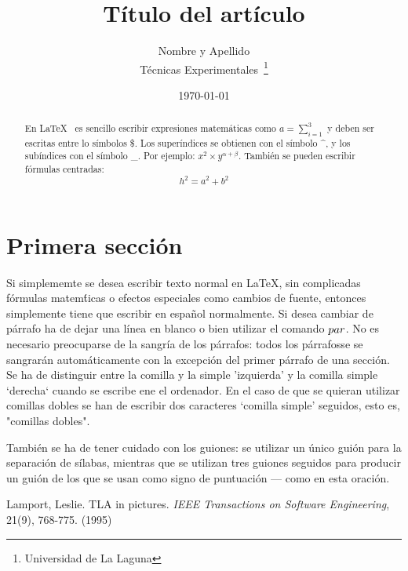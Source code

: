 \documentclass[a4paper,12pt]{article}
\begin{document}
\title{Título del artículo}
\author{Nombre y Apellido \\
Técnicas Experimentales~\footnote{Universidad de La Laguna}
}
\date{\today}
\maketitle

\begin{abstract}
En \LaTeX{}~\cite{Lam:86} es sencillo escribir expresiones
matemáticas como $a=\sum_{i=1}^{3}$
y deben ser escritas entre lo símbolos \$.
Los superíndices se obtienen con el símbolo \^{}, y
los subíndices con el símbolo \_.
Por ejemplo: $x^2 \times y^{\alpha + \beta}$.
También se pueden escribir fórmulas centradas:
\[h^2=a^2 + b^2 \]
\end{abstract}

\section{Primera sección}
Si simplememte se desea escribir texto normal en LaTeX,
sin complicadas f\'ormulas matem\'ticas o efectos especiales
como cambios de fuente, entonces simplemente tiene que escribir
en espa\~nol normalmente.
Si desea cambiar de párrafo ha de dejar una línea en blanco o bien
utilizar el comando $\\par$.
No es necesario preocuparse de la sangría de los párrafos:
todos los párrafosse se sangrarán automáticamente con la excepción
del primer párrafo de una sección.
Se ha de distinguir entre la comilla y la simple 'izquierda'
y la comilla simple `derecha` cuando se escribe ene el ordenador.
En el caso de que se quieran utilizar comillas dobles se han de
escribir dos caracteres `comilla simple' seguidos, esto es,
"comillas dobles". \par
También se ha de tener cuidado con los guiones: se utilizar un único
guión para la separación de sílabas, mientras que se utilizan
tres guiones seguidos para producir un guión de los que se usan
como signo de puntuación --- como en esta oración.
\begin{thebibliography}{00}
 Lamport, Leslie.
 TLA in pictures.
 \emph{IEEE Transactions on Software Engineering},
 21(9), 768-775.
 (1995)
 \end{thebibliography}
 
\end{document}
